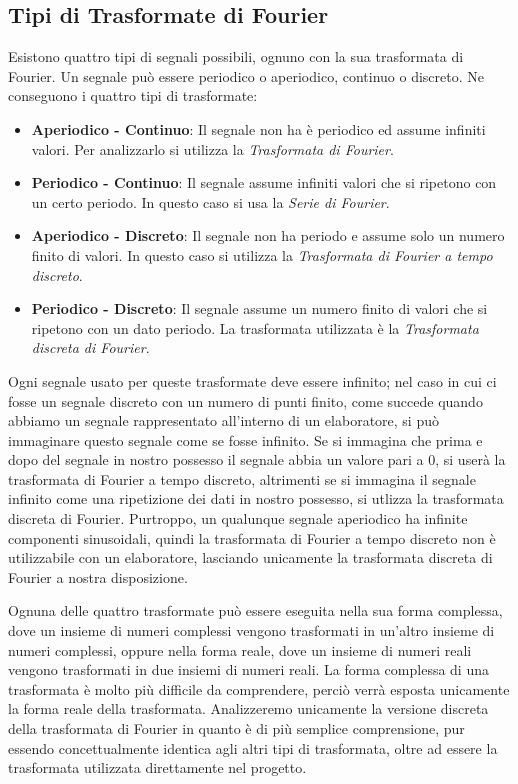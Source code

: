\subsection{Tipi di Trasformate di Fourier}
Esistono quattro tipi di segnali possibili, ognuno con la sua trasformata di
Fourier. Un segnale pu\`o essere periodico o aperiodico, continuo o discreto. Ne
conseguono i quattro tipi di trasformate:
\begin{itemize}
	\item \textbf{Aperiodico - Continuo}: Il segnale non ha \`e periodico ed
		assume infiniti valori. Per analizzarlo si utilizza la \emph{Trasformata
		di Fourier}.
	\item \textbf{Periodico - Continuo}: Il segnale assume infiniti valori che
		si ripetono con un certo periodo. In questo caso si usa la \emph{Serie
		di Fourier}.
	\item \textbf{Aperiodico - Discreto}: Il segnale non ha periodo e assume
		solo un numero finito di valori. In questo caso si utilizza la
		\emph{Trasformata di Fourier a tempo discreto}.
	\item \textbf{Periodico - Discreto}: Il segnale assume un numero finito di
		valori che si ripetono con un dato periodo. La trasformata utilizzata
		\`e la \emph{Trasformata discreta di Fourier}.
\end{itemize}
Ogni segnale usato per queste trasformate deve essere infinito; nel caso in cui
ci fosse un segnale discreto con un numero di punti finito, come succede quando
abbiamo un segnale rappresentato all'interno di un elaboratore, si pu\`o
immaginare questo segnale come se fosse infinito. Se si immagina che prima e
dopo del segnale in nostro possesso il segnale abbia un valore pari a 0, si
user\`a la trasformata di Fourier a tempo discreto, altrimenti se si immagina il
segnale infinito come una ripetizione dei dati in nostro possesso, si utlizza la
trasformata discreta di Fourier. Purtroppo, un qualunque segnale aperiodico ha
infinite componenti sinusoidali, quindi la trasformata di Fourier a tempo
discreto non \`e utilizzabile con un elaboratore, lasciando unicamente la
trasformata discreta di Fourier a nostra disposizione.

Ognuna delle quattro trasformate pu\`o essere eseguita nella sua forma
complessa, dove un insieme di numeri complessi vengono trasformati in un'altro
insieme di numeri complessi, oppure nella forma reale, dove un insieme di numeri
reali vengono trasformati in due insiemi di numeri reali. La forma complessa
di una trasformata \`e molto pi\`u difficile da comprendere, perci\`o verr\`a
esposta unicamente la forma reale della trasformata. Analizzeremo unicamente la
versione discreta della trasformata di Fourier in quanto \`e di pi\`u
semplice comprensione, pur essendo concettualmente identica agli altri tipi di
trasformata, oltre ad essere la trasformata utilizzata direttamente nel
progetto.

